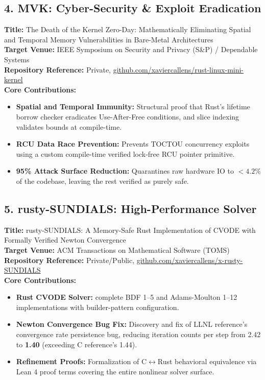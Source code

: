 \documentclass[11pt,a4paper]{article}
\begin{document}
\subsection{4. MVK: Cyber-Security & Exploit Eradication}
\textbf{Title:} The Death of the Kernel Zero-Day: Mathematically Eliminating Spatial and Temporal Memory Vulnerabilities in Bare-Metal Architectures \\
\textbf{Target Venue:} IEEE Symposium on Security and Privacy (S\&P) / Dependable Systems \\
\textbf{Repository Reference:} Private, \url{github.com/xaviercallens/rust-linux-mini-kernel} \\
\textbf{Core Contributions:}
\begin{itemize}
    \item \textbf{Spatial and Temporal Immunity:} Structural proof that Rust's lifetime borrow checker eradicates Use-After-Free conditions, and slice indexing validates bounds at compile-time.
    \item \textbf{RCU Data Race Prevention:} Prevents TOCTOU concurrency exploits using a custom compile-time verified lock-free RCU pointer primitive.
    \item \textbf{95\% Attack Surface Reduction:} Quarantines raw hardware IO to $<4.2\%$ of the codebase, leaving the rest verified as purely safe.
\end{itemize}

\subsection{5. rusty-SUNDIALS: High-Performance Solver}
\textbf{Title:} rusty-SUNDIALS: A Memory-Safe Rust Implementation of CVODE with Formally Verified Newton Convergence \\
\textbf{Target Venue:} ACM Transactions on Mathematical Software (TOMS) \\
\textbf{Repository Reference:} Private/Public, \url{github.com/xaviercallens/x-rusty-SUNDIALS} \\
\textbf{Core Contributions:}
\begin{itemize}
    \item \textbf{Rust CVODE Solver:} complete BDF 1--5 and Adams-Moulton 1--12 implementations with builder-pattern configuration.
    \item \textbf{Newton Convergence Bug Fix:} Discovery and fix of LLNL reference's convergence rate persistence bug, reducing iteration counts per step from 2.42 to \textbf{1.40} (exceeding C reference's 1.44).
    \item \textbf{Refinement Proofs:} Formalization of C$\leftrightarrow$Rust behavioral equivalence via Lean 4 proof terms covering the entire nonlinear solver surface.
\end{itemize}
\end{document}
